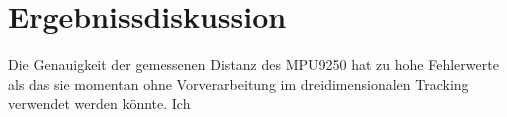 \chapter{Ergebnissdiskussion}
Die Genauigkeit der gemessenen Distanz des MPU9250 hat zu hohe Fehlerwerte als 
das sie momentan ohne Vorverarbeitung im dreidimensionalen Tracking verwendet werden könnte.
Ich 